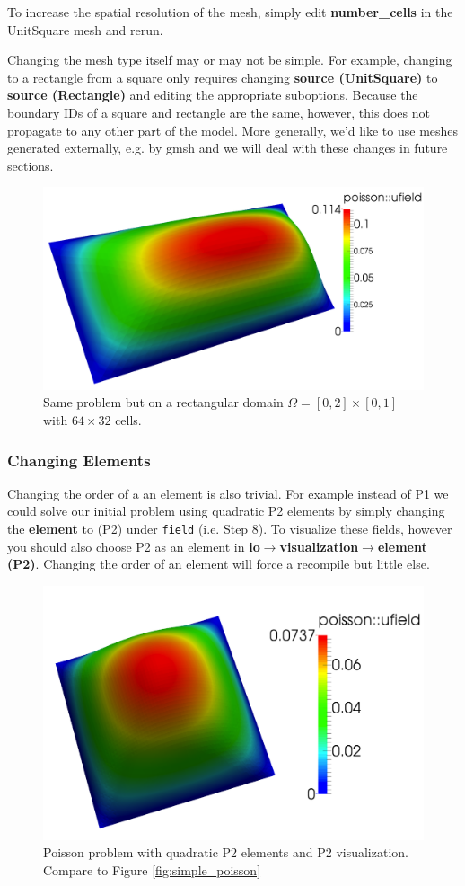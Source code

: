 To increase the spatial resolution of the mesh, simply edit
\textbf{number\_cells} in the UnitSquare mesh and rerun.

Changing the mesh type
itself may or may not be simple.  For example, changing to a rectangle
from a square only requires changing \textbf{source (UnitSquare)} to
\textbf{source (Rectangle)} and editing the appropriate
suboptions. Because the boundary IDs of a square and rectangle are
the same, however, this does not propagate to any other part of the
model. More generally, we'd like to use meshes generated externally, e.g. by
gmsh and we will deal with these changes in future sections.
\begin{figure}[h!]
  \centering
\includegraphics[width=.7\textwidth]{figures/poisson_simple_rectangle}
  \caption{Same problem but on a rectangular domain
    $\Omega=[0,2]\times[0,1]$ with $64\times32$ cells.}
\label{fig:poisson_rectangle}
\end{figure}

\subsubsection{Changing Elements}
\label{sec:changing-meshes}

Changing the order of a an element is also trivial. For example
instead of P1 we could solve our initial problem using quadratic P2
elements by simply changing the \textbf{element} to (P2) under
\texttt{field} (i.e. Step 8).  To visualize these fields, however you
should also choose P2 as an element in
\textbf{io}$\rightarrow$\textbf{visualization}$\rightarrow$\textbf{element
(P2)}.  Changing the order of an element will force a recompile but
little else.
\begin{figure}[ht!]
  \centering
  \includegraphics[width=.7\textwidth]{figures/poisson_simple_p2}
  \caption{Poisson problem with quadratic P2 elements and P2
    visualization. Compare to Figure \ref{fig:simple_poisson}}
  \label{fig:poisson-P2}
\end{figure}

